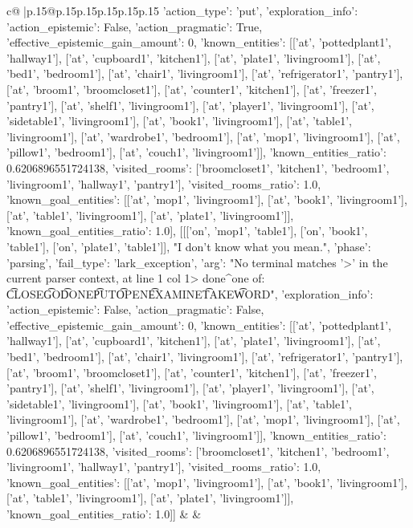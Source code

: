 \documentclass{article}
\begin{document}
{\begin{supertabular}{c@{$\;$}|p{.15\linewidth}@{}p{.15\linewidth}p{.15\linewidth}p{.15\linewidth}p{.15\linewidth}p{.15\linewidth}}
{{{{'action_type': 'put', 'exploration_info': {'action_epistemic': False, 'action_pragmatic': True, 'effective_epistemic_gain_amount': 0, 'known_entities': [['at', 'pottedplant1', 'hallway1'], ['at', 'cupboard1', 'kitchen1'], ['at', 'plate1', 'livingroom1'], ['at', 'bed1', 'bedroom1'], ['at', 'chair1', 'livingroom1'], ['at', 'refrigerator1', 'pantry1'], ['at', 'broom1', 'broomcloset1'], ['at', 'counter1', 'kitchen1'], ['at', 'freezer1', 'pantry1'], ['at', 'shelf1', 'livingroom1'], ['at', 'player1', 'livingroom1'], ['at', 'sidetable1', 'livingroom1'], ['at', 'book1', 'livingroom1'], ['at', 'table1', 'livingroom1'], ['at', 'wardrobe1', 'bedroom1'], ['at', 'mop1', 'livingroom1'], ['at', 'pillow1', 'bedroom1'], ['at', 'couch1', 'livingroom1']], 'known_entities_ratio': 0.6206896551724138, 'visited_rooms': ['broomcloset1', 'kitchen1', 'bedroom1', 'livingroom1', 'hallway1', 'pantry1'], 'visited_rooms_ratio': 1.0, 'known_goal_entities': [['at', 'mop1', 'livingroom1'], ['at', 'book1', 'livingroom1'], ['at', 'table1', 'livingroom1'], ['at', 'plate1', 'livingroom1']], 'known_goal_entities_ratio': 1.0}}], [[['on', 'mop1', 'table1'], ['on', 'book1', 'table1'], ['on', 'plate1', 'table1']], "I don't know what you mean.", {'phase': 'parsing', 'fail_type': 'lark_exception', 'arg': "No terminal matches '>' in the current parser context, at line 1 col 1\n\n> done\n^\nExpected one of: \n\t* CLOSE\n\t* GO\n\t* DONE\n\t* PUT\n\t* OPEN\n\t* EXAMINE\n\t* TAKE\n\t* WORD\n", 'exploration_info': {'action_epistemic': False, 'action_pragmatic': False, 'effective_epistemic_gain_amount': 0, 'known_entities': [['at', 'pottedplant1', 'hallway1'], ['at', 'cupboard1', 'kitchen1'], ['at', 'plate1', 'livingroom1'], ['at', 'bed1', 'bedroom1'], ['at', 'chair1', 'livingroom1'], ['at', 'refrigerator1', 'pantry1'], ['at', 'broom1', 'broomcloset1'], ['at', 'counter1', 'kitchen1'], ['at', 'freezer1', 'pantry1'], ['at', 'shelf1', 'livingroom1'], ['at', 'player1', 'livingroom1'], ['at', 'sidetable1', 'livingroom1'], ['at', 'book1', 'livingroom1'], ['at', 'table1', 'livingroom1'], ['at', 'wardrobe1', 'bedroom1'], ['at', 'mop1', 'livingroom1'], ['at', 'pillow1', 'bedroom1'], ['at', 'couch1', 'livingroom1']], 'known_entities_ratio': 0.6206896551724138, 'visited_rooms': ['broomcloset1', 'kitchen1', 'bedroom1', 'livingroom1', 'hallway1', 'pantry1'], 'visited_rooms_ratio': 1.0, 'known_goal_entities': [['at', 'mop1', 'livingroom1'], ['at', 'book1', 'livingroom1'], ['at', 'table1', 'livingroom1'], ['at', 'plate1', 'livingroom1']], 'known_goal_entities_ratio': 1.0}}]] 
	  } 
	   } 
	   } 
	 & & \\ 
 


\end{supertabular}}
\end{document}
